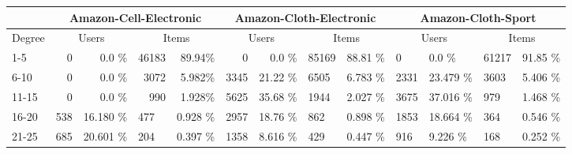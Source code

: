 \begin{table*}[]
    \scriptsize
    \centering
    \begin{tabular}{|l|l|l|l|l|l|l|l|l|l|l|l|l|}
        \hline
                & \multicolumn{4}{c|}{Amazon-Cell-Electronic} & \multicolumn{4}{c|}{Amazon-Cloth-Electronic} & \multicolumn{4}{c|}{Amazon-Cloth-Sport}                                                                                                                                        \\ \hline
        Degree   & \multicolumn{2}{c|}{Users}                  & \multicolumn{2}{c|}{Items}                   & \multicolumn{2}{c|}{Users}              & \multicolumn{2}{c|}{Items} & \multicolumn{2}{c|}{Users} & \multicolumn{2}{c|}{Items}                                                 \\ \hline
        1-5     & \multicolumn{1}{r|}{0}                      & \multicolumn{1}{r|}{0.0 \%}                     & \multicolumn{1}{r|}{46183}              & \multicolumn{1}{r|}{89.94\%} & \multicolumn{1}{r|}{0}     & \multicolumn{1}{r|}{0.0 \%}   & 85169 & 88.81 \% & 0    & 0.0 \%   & 61217 & 91.85 \%\\ \hline
        6-10    & \multicolumn{1}{r|}{0}                      & \multicolumn{1}{r|}{0.0 \%}                     & \multicolumn{1}{r|}{3072}               & \multicolumn{1}{r|}{5.982\%} & \multicolumn{1}{r|}{3345}  & \multicolumn{1}{r|}{21.22 \%} & 6505  & 6.783 \% & 2331 & 23.479 \%& 3603  & 5.406 \%\\ \hline
        11-15   & \multicolumn{1}{r|}{0}                      & \multicolumn{1}{r|}{0.0 \%}                     & \multicolumn{1}{r|}{990}                & \multicolumn{1}{r|}{1.928\%} & \multicolumn{1}{r|}{5625}  & \multicolumn{1}{r|}{35.68 \%} & 1944  & 2.027 \% & 3675 & 37.016 \%& 979   & 1.468 \%\\ \hline
        16-20   & 538                                         & 16.180 \%                                      & 477                                     & 0.928 \%                     & 2957                       & 18.76 \%                     & 862   & 0.898 \% & 1853 & 18.664 \%& 364   & 0.546 \%\\ \hline
        21-25   & 685                                         & 20.601 \%                                      & 204                                     & 0.397 \%                     & 1358                       & 8.616 \%                     & 429   & 0.447 \% & 916  & 9.226 \% & 168   & 0.252 \%\\ \hline

\end{tabular}
\end{table*}
